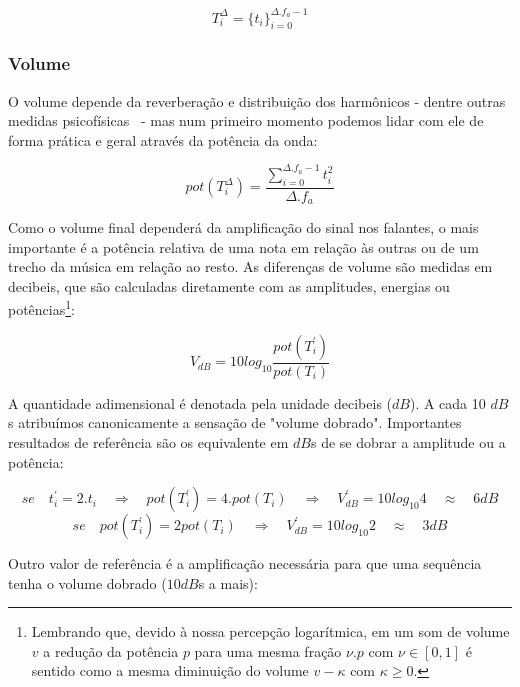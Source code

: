 \begin{equation}
T_{i}^{\Delta}={\{t_i\}}_{i=0}^{\Delta . f_a - 1}
\end{equation}


\subsubsection{Volume}
O volume depende da reverberação e distribuição dos harmônicos - dentre outras medidas psicofísicas~\cite{chowningVolume} - mas num primeiro momento podemos lidar com ele de forma prática e geral através da potência da onda:

\begin{equation}\label{potencia}
pot(T_i^{\Delta})=\frac{\sum_{i=0}^{\Delta . f_a -1} t_i^2}{\Delta . f_a}
\end{equation} 

Como o volume final dependerá da amplificação do sinal nos falantes, o mais importante é a potência relativa de uma nota em relação às outras ou de um trecho da música em relação ao resto. As diferenças de volume são medidas em decibeis, que são
calculadas diretamente com as amplitudes, energias ou potências\footnote{Lembrando que, devido à nossa percepção logarítmica,
em um som de volume $v$ a redução da potência $p$ para uma mesma fração $\nu . p $ 
com $\nu \in [0,1]$ é sentido como a mesma diminuição do volume $v-\kappa$ com $\kappa \geq 0$.}:

\begin{equation}\label{decibeis}
V_{dB}=10log_{10}\frac{pot(T^{'}_i)}{pot(T_i)}
\end{equation}

A quantidade adimensional é denotada pela unidade decibeis ($dB$). A cada 10 $dB$s atribuímos canonicamente
a sensação de "volume dobrado". Importantes resultados de referência são os equivalente em $dB$s de se dobrar
a amplitude ou a potência:

\begin{equation*}
se \quad  t_i^{'}=2 . t_i \quad \Rightarrow \quad pot(T^{'}_i)=4 . pot(T_i) \quad \Rightarrow \quad V^{'}_{dB}=10log_{10} 4 \quad  \approx \quad 6 dB
\end{equation*}
\begin{equation*}
se \quad pot(T^{'}_i)=2 pot(T_i) \quad \Rightarrow \quad V^{'}_{dB}=10log_{10} 2 \quad \approx \quad 3 dB
\end{equation*}

Outro valor de referência é a amplificação necessária para que uma sequência tenha o volume dobrado ($10dB$s a mais):


